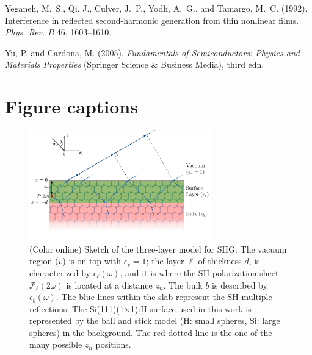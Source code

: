 \documentclass[utf8]{frontiersSCNS}
\begin{document}
\begin{thebibliography}{40}
Yeganeh, M.~S., Qi, J., Culver, J.~P., Yodh, A.~G., and Tamargo, M.~C. (1992).
\newblock Interference in reflected second-harmonic generation from thin
  nonlinear films.
\newblock \emph{Phys. Rev. B} 46, 1603--1610.
\newblock {}

Yu, P. and Cardona, M. (2005).
\newblock \emph{Fundamentals of {Semiconductors}: {Physics} and {Materials}
  {Properties}} (Springer Science \& Business Media), third edn.

\end{thebibliography}




\section*{Figure captions}

\begin{figure}[b]
\centering 
\includegraphics[width=0.7\textwidth]{fig1}
\caption{(Color online) Sketch of the three-layer model for SHG. The vacuum
region ($v$) is on top with $\epsilon_{v}=1$; the layer $\ell$ of thickness $d$,
is characterized by $\epsilon_{\ell}(\omega)$, and it is where the SH
polarization sheet $\boldsymbol{\mathcal{P}}_{\ell}(2\omega)$ is located at a
distance $z_{n}$. The bulk $b$ is described by $\epsilon_{b}(\omega)$. The blue
lines within the slab represent the SH multiple reflections. The
Si(111)(1$\times$1):H surface used in this work is represented by the ball and
stick model (H: small spheres, Si: large spheres) in the background. The red
dotted line is the one of the many possible $z_{n}$ positions.}
\label{fig:MR3layer2w}
\end{figure}
\end{document}
